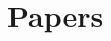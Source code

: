 \documentclass[
  paper=16.9cm:23.9cm,
  pagesize,
  twoside,
  10pt,
  chapterprefix,
  headsepline=on,
  footinclude=off,
  DIV=18,
  BCOR=7mm,
  bibliography=totoc,
  numbers=noenddot,
  open=right,
]{scrreprt}
\begin{document}
\part{Papers}
\setcounter{secnumdepth}{2}

\initpapers
\renewcommand\bibname{References}

\renewcommand\sectionmark[1]{\markright{\MakeMarkcase {\thesection\hskip .5em\relax#1}}}
\rohead{\rightmark}
\rofoot{\pagemark}
\lefoot{\pagemark}







\end{document}
